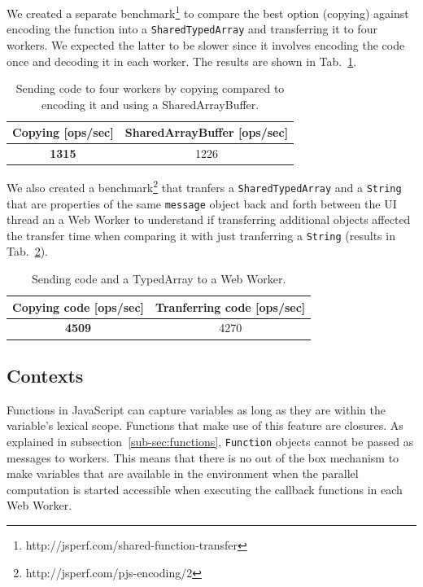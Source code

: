 \documentclass[runningheads,a4paper]{llncs}
\begin{document}
We created a separate benchmark\footnote{http://jsperf.com/shared-function-transfer} to compare the best option (copying) against encoding the function into a \verb+SharedTypedArray+ and transferring it to four workers. We expected the latter to be slower since it involves encoding the code once and decoding it in each worker. The results are shown in Tab.~\ref{tab:copy-vs-shared}.

\begin{table}
  \centering
  \begin{tabular}{|c|c|}
    \hline
    Copying [ops/sec] & SharedArrayBuffer [ops/sec] \\
    \hline
    \textbf{1315} & 1226 \\
    \hline
  \end{tabular}
  \caption{Sending code to four workers by copying compared to encoding it and using a SharedArrayBuffer.}
  \label{tab:copy-vs-shared}
\end{table}

We also created a benchmark\footnote{http://jsperf.com/pjs-encoding/2} that tranfers a \verb+SharedTypedArray+ and a \verb+String+ that are properties of the same \verb+message+ object back and forth between the UI thread an a Web Worker to understand if transferring additional objects affected the transfer time when comparing it with just tranferring a \verb+String+ (results in Tab.~\ref{tab:send-function-and-array}).
\begin{table}
  \centering
  \begin{tabular}{|c|c|}
    \hline
    Copying code [ops/sec] & Tranferring code [ops/sec] \\
    \hline
    \textbf{4509} & 4270 \\
    \hline
  \end{tabular}
  \caption{Sending code and a TypedArray to a Web Worker.}
  \label{tab:send-function-and-array}
\end{table}

\subsection{Contexts}\label{sub-sec:context}
Functions in JavaScript can capture variables as long as they are within the variable's lexical scope. Functions that make use  of this feature are closures. As explained in subsection~\ref{sub-sec:functions}, \verb+Function+ objects cannot be passed as messages to workers. This means that there is no out of the box mechanism to make variables that are available in the environment when the parallel computation is started accessible when executing the callback functions in each Web Worker.
\end{document}
